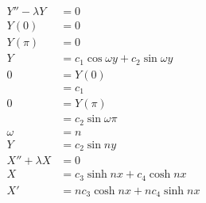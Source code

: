 \documentclass{article}
\begin{document}
\begin{align*}
  Y'' - \lambda Y                   & = 0                                                                                                                           \\
  Y(0)                              & = 0                                                                                                                           \\
  Y(\pi)                            & = 0                                                                                                                           \\
  Y                                 & = c_1 \cos \omega y + c_2 \sin \omega y                                                                                       \\
  0                                 & = Y(0)                                                                                                                        \\
                                    & = c_1                                                                                                                         \\
  0                                 & = Y(\pi)                                                                                                                      \\
                                    & = c_2 \sin \omega \pi                                                                                                         \\
  \omega                            & = n                                                                                                                           \\
  Y                                 & = c_2 \sin n y                                                                                                                \\
  X'' + \lambda X                   & = 0                                                                                                                           \\
  X                                 & = c_3 \sinh n x + c_4 \cosh n x                                                                                               \\
  X'                                & = n c_3 \cosh n x + n c_4 \sinh n x                                                                                           \\

\end{align*}
\end{document}
